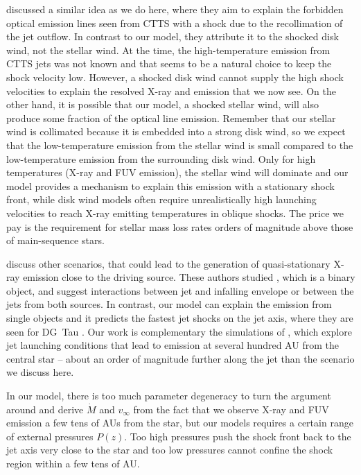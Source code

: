 \citet{1993ApJ...409..748G} discussed a similar idea as we do here, where they aim to explain the forbidden optical emission lines seen from CTTS with a shock due to the recollimation of the jet outflow. In contrast to our model, they attribute it to the shocked disk wind, not the stellar wind. At the time, the high-temperature emission from CTTS jets was not known and that seems to be a natural choice to keep the shock velocity low. However, a shocked disk wind cannot supply the high shock velocities to explain the resolved X-ray and  emission that we now see. On the other hand, it is possible that our model, a shocked stellar wind, will also produce some fraction of the optical line emission.
Remember that our stellar wind is collimated because it is embedded into a strong disk wind, so we expect that the low-temperature emission from the stellar wind is small compared to the low-temperature emission from the surrounding disk wind. Only for high temperatures (X-ray and FUV emission), the stellar wind will dominate and our model provides a mechanism to explain this emission with a stationary shock front, while disk wind models often require unrealistically high launching velocities to reach X-ray emitting temperatures in oblique shocks. The price we pay is the requirement for stellar mass loss rates orders of magnitude above those of main-sequence stars.

\citet{2003ApJ...584..843B} discuss other scenarios, that could lead to the generation of quasi-stationary X-ray emission close to the driving source. These authors studied , which is a binary object, and suggest interactions between jet and infalling envelope or between the jets from both sources. In contrast, our model can explain the emission from single objects and it predicts the fastest jet shocks on the jet axis, where they are seen for DG~Tau \citep{2013A&A...550L...1S}. Our work is complementary the simulations of \citet{2010A&A...511A..42B,2010A&A...517A..68B,2011ApJ...737...54B}, which explore jet launching conditions that lead to emission at several hundred AU from the central star -- about an order of magnitude further along the jet than the scenario we discuss here.

In our model, there is too much parameter degeneracy to turn the argument around and derive $\dot M$ and  $v_\infty$ from the fact that we observe X-ray and FUV emission a few tens of AUs from the star, but our models requires a certain range of external pressures $P(z)$. Too high pressures push the shock front back to the jet axis very close to the star and too low pressures cannot confine the shock region within a few tens of AU.

